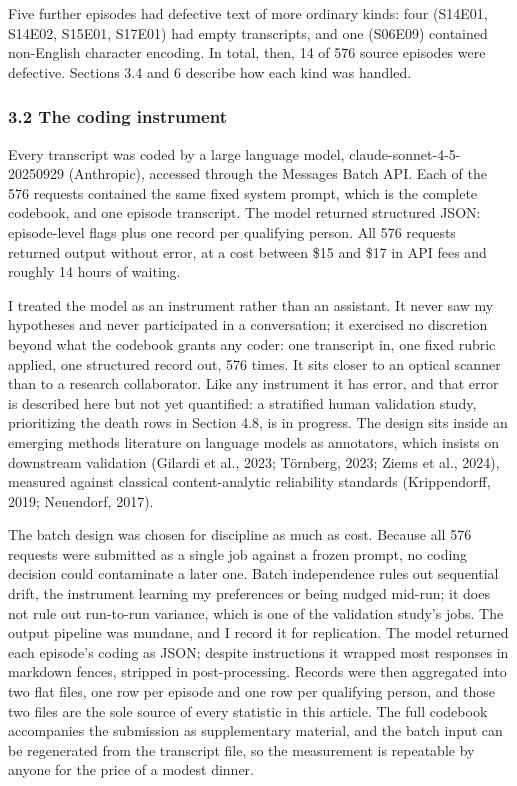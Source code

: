 \documentclass[
]{article}
\begin{document}
Five further episodes had defective text of more ordinary kinds: four
(S14E01, S14E02, S15E01, S17E01) had empty transcripts, and one (S06E09)
contained non-English character encoding. In total, then, 14 of 576
source episodes were defective. Sections 3.4 and 6 describe how each
kind was handled.

\subsubsection{3.2 The coding instrument}\label{the-coding-instrument}

Every transcript was coded by a large language model,
claude-sonnet-4-5-20250929 (Anthropic), accessed through the Messages
Batch API. Each of the 576 requests contained the same fixed system
prompt, which is the complete codebook, and one episode transcript. The
model returned structured JSON: episode-level flags plus one record per
qualifying person. All 576 requests returned output without error, at a
cost between \$15 and \$17 in API fees and roughly 14 hours of waiting.

I treated the model as an instrument rather than an assistant. It never
saw my hypotheses and never participated in a conversation; it exercised
no discretion beyond what the codebook grants any coder: one transcript
in, one fixed rubric applied, one structured record out, 576 times. It
sits closer to an optical scanner than to a research collaborator. Like
any instrument it has error, and that error is described here but not
yet quantified: a stratified human validation study, prioritizing the
death rows in Section 4.8, is in progress. The design sits inside an
emerging methods literature on language models as annotators, which
insists on downstream validation (Gilardi et al., 2023; Törnberg, 2023;
Ziems et al., 2024), measured against classical content-analytic
reliability standards (Krippendorff, 2019; Neuendorf, 2017).

The batch design was chosen for discipline as much as cost. Because all
576 requests were submitted as a single job against a frozen prompt, no
coding decision could contaminate a later one. Batch independence rules
out sequential drift, the instrument learning my preferences or being
nudged mid-run; it does not rule out run-to-run variance, which is one
of the validation study's jobs. The output pipeline was mundane, and I
record it for replication. The model returned each episode's coding as
JSON; despite instructions it wrapped most responses in markdown fences,
stripped in post-processing. Records were then aggregated into two flat
files, one row per episode and one row per qualifying person, and those
two files are the sole source of every statistic in this article. The
full codebook accompanies the submission as supplementary material, and
the batch input can be regenerated from the transcript file, so the
measurement is repeatable by anyone for the price of a modest dinner.
\end{document}
